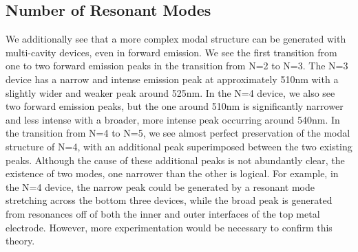 \documentclass{report}
\begin{document}
        \subsection{Number of Resonant Modes} \label{numModes}
        We additionally see that a more complex modal structure can be generated with multi-cavity devices, even in forward emission. We see the first transition from one to two forward emission peaks in the transition from N=2 to N=3. The N=3 device has a narrow and intense emission peak at approximately 510nm with a slightly wider and weaker peak around 525nm. In the N=4 device, we also see two forward emission peaks, but the one around 510nm is significantly narrower and less intense with a broader, more intense peak occurring around 540nm. In the transition from N=4 to N=5, we see almost perfect preservation of the modal structure of N=4, with an additional peak superimposed between the two existing peaks. Although the cause of these additional peaks is not abundantly clear, the existence of two modes, one narrower than the other is logical. For example, in the N=4 device, the narrow peak could be generated by a resonant mode stretching across the bottom three devices, while the broad peak is generated from resonances off of both the inner and outer interfaces of the top metal electrode. However, more experimentation would be necessary to confirm this theory.
\end{document}
